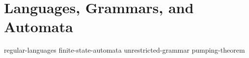 \chapter{Languages, Grammars, and Automata}\label{chap:languages}

{regular-languages}
{finite-state-automata}
{unrestricted-grammar}
{pumping-theorem}
